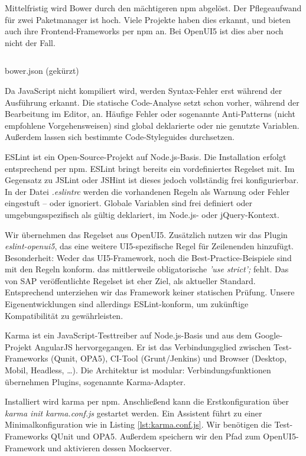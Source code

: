 Mittelfristig wird Bower durch den mächtigeren npm abgelöst. Der Pflegeaufwand für zwei Paketmanager ist hoch. Viele Projekte haben dies erkannt, und bieten auch ihre Frontend-Frameworks per npm an. Bei OpenUI5 ist dies aber noch nicht der Fall.

\begin{listing}[H]
	\inputminted{json}{src/bower.json}
	\caption{bower.json (gekürzt)}
	\label{lst:bower.json}
\end{listing}

Da JavaScript nicht kompiliert wird, werden Syntax-Fehler erst während der Ausführung erkannt. Die statische Code-Analyse setzt schon vorher, während der Bearbeitung im Editor, an. Häufige Fehler oder sogenannte Anti-Patterns (nicht empfohlene Vorgehensweisen) sind global deklarierte oder nie genutzte Variablen. Außerdem lassen sich bestimmte Code-Styleguides durchsetzen.

ESLint ist ein Open-Source-Projekt auf Node.js-Basis. Die Installation erfolgt entsprechend per npm. ESLint bringt bereits ein vordefiniertes Regelset mit. Im Gegensatz zu JSLint oder JSHint ist dieses jedoch vollständig frei konfigurierbar. In der Datei \textit{.eslintrc} werden die vorhandenen Regeln als Warnung oder Fehler eingestuft -- oder ignoriert. Globale Variablen sind frei definiert oder umgebungsspezifisch als gültig deklariert, \zB im Node.js- oder jQuery-Kontext.

Wir übernehmen das Regelset aus OpenUI5. Zusätzlich nutzen wir das Plugin \textit{eslint-openui5}, das eine weitere UI5-spezifische Regel für Zeilenenden hinzufügt. Besonderheit: Weder das UI5-Framework, noch die Best-Practice-Beispiele sind mit den Regeln konform. \ZB das mittlerweile obligatorische \textit{'use strict';} fehlt. Das von SAP veröffentlichte Regelset ist eher Ziel, als aktueller Standard. Entsprechend unterziehen wir das Framework keiner statischen Prüfung. Unsere Eigenentwicklungen sind allerdings ESLint-konform, um zukünftige Kompatibilität zu gewährleisten.

\label{sec:karma}
Karma ist ein JavaScript-Testtreiber auf Node.js-Basis und aus dem Google-Projekt AngularJS hervorgegangen. Er ist das Verbindungsglied zwischen Test-Frameworks (Qunit, OPA5), CI-Tool (Grunt/Jenkins) und Browser (Desktop, Mobil, Headless, \dots). Die Architektur ist modular: Verbindungsfunktionen übernehmen Plugins, sogenannte Karma-Adapter.

Installiert wird karma per npm. Anschließend kann die Erstkonfiguration über \textit{karma init karma.conf.js} gestartet werden. Ein Assistent führt zu einer Minimalkonfiguration wie in Listing \ref{lst:karma.conf.js}. Wir benötigen die Test-Frameworks QUnit und OPA5. Außerdem speichern wir den Pfad zum OpenUI5-Framework und aktivieren dessen Mockserver. 

